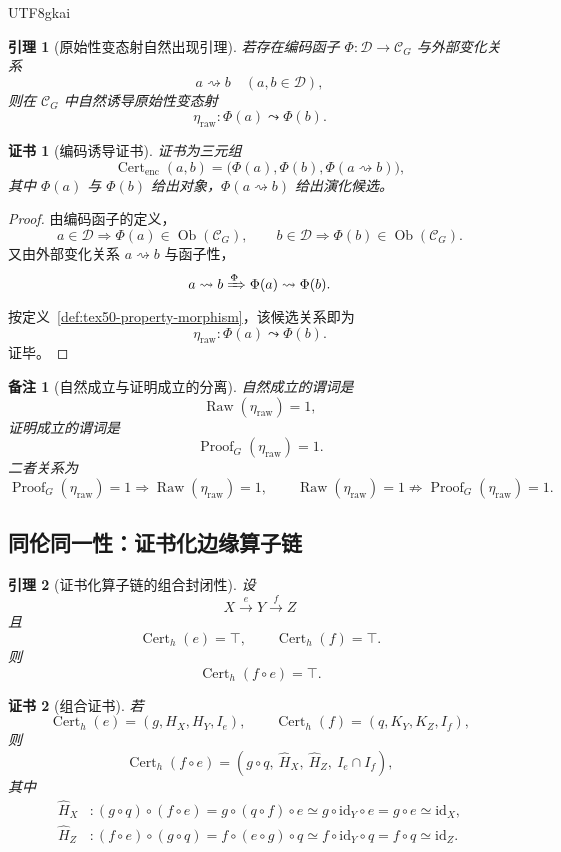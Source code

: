 \documentclass[12pt]{article}
\newtheorem{lemma}{引理}[section]
\newtheorem{remark}{备注}[section]
\newtheorem{Certificate}{证书}[section]
\newcommand{\Cat}{\mathcal{C}}
\newcommand{\id}{\mathrm{id}}
\newcommand{\Cert}{\operatorname{Cert}}
\newcommand{\Proof}{\operatorname{Proof}}
\begin{document}
\begin{CJK*}{UTF8}{gkai}
\begin{lemma}[原始性变态射自然出现引理]
\label{lem:tex50-raw-natural}
若存在编码函子 $\Phi:\mathcal D\to\Cat_G$ 与外部变化关系
\[
  a\rightsquigarrow b\quad(a,b\in\mathcal D),
\]
则在 $\Cat_G$ 中自然诱导原始性变态射
\[
  \eta_{\mathrm{raw}}:\Phi(a)\leadsto\Phi(b).
\]
\end{lemma}

\begin{Certificate}[编码诱导证书]
证书为三元组
\[
  \Cert_{\mathrm{enc}}(a,b)
  =
  \bigl(\Phi(a),\Phi(b),\Phi(a\rightsquigarrow b)\bigr),
\]
其中 $\Phi(a)$ 与 $\Phi(b)$ 给出对象，$\Phi(a\rightsquigarrow b)$ 给出演化候选。
\end{Certificate}

\begin{proof}
由编码函子的定义，
\[
  a\in\mathcal D\Rightarrow \Phi(a)\in\operatorname{Ob}(\Cat_G),
  \qquad
  b\in\mathcal D\Rightarrow \Phi(b)\in\operatorname{Ob}(\Cat_G).
\]
又由外部变化关系 $a\rightsquigarrow b$ 与函子性，
\[
  a\rightsquigarrow b
  \xRightarrow{\Phi}
  \Phi(a)\rightsquigarrow\Phi(b).
\]
按定义~\ref{def:tex50-property-morphism}，该候选关系即为
\[
  \eta_{\mathrm{raw}}:\Phi(a)\leadsto\Phi(b).
\]
证毕。
\end{proof}

\begin{remark}[自然成立与证明成立的分离]
自然成立的谓词是
\[
  \operatorname{Raw}(\eta_{\mathrm{raw}})=1,
\]
证明成立的谓词是
\[
  \Proof_G(\eta_{\mathrm{raw}})=1.
\]
二者关系为
\[
  \Proof_G(\eta_{\mathrm{raw}})=1
  \Rightarrow
  \operatorname{Raw}(\eta_{\mathrm{raw}})=1,
  \qquad
  \operatorname{Raw}(\eta_{\mathrm{raw}})=1
  \not\Rightarrow
  \Proof_G(\eta_{\mathrm{raw}})=1.
\]
\end{remark}

\subsection{同伦同一性：证书化边缘算子链}
\label{subsec:tex50-homotopy-identity}

\begin{lemma}[证书化算子链的组合封闭性]
\label{lem:tex50-certified-composition}
设
\[
  X\xrightarrow{e}Y\xrightarrow{f}Z
\]
且
\[
  \Cert_h(e)=\top,\qquad \Cert_h(f)=\top.
\]
则
\[
  \Cert_h(f\circ e)=\top.
\]
\end{lemma}

\begin{Certificate}[组合证书]
若
\[
  \Cert_h(e)=(g,H_X,H_Y,I_e),
  \qquad
  \Cert_h(f)=(q,K_Y,K_Z,I_f),
\]
则
\[
  \Cert_h(f\circ e)
  =
  (g\circ q,\ \widehat H_X,\ \widehat H_Z,\ I_e\cap I_f),
\]
其中
\[
\begin{aligned}
  \widehat H_X&:
  (g\circ q)\circ(f\circ e)
  =
  g\circ(q\circ f)\circ e
  \simeq
  g\circ\id_Y\circ e
  =
  g\circ e
  \simeq
  \id_X,\\
  \widehat H_Z&:
  (f\circ e)\circ(g\circ q)
  =
  f\circ(e\circ g)\circ q
  \simeq
  f\circ\id_Y\circ q
  =
  f\circ q
  \simeq
  \id_Z.
\end{aligned}
\]
\end{Certificate}


\end{CJK*}
\end{document}
